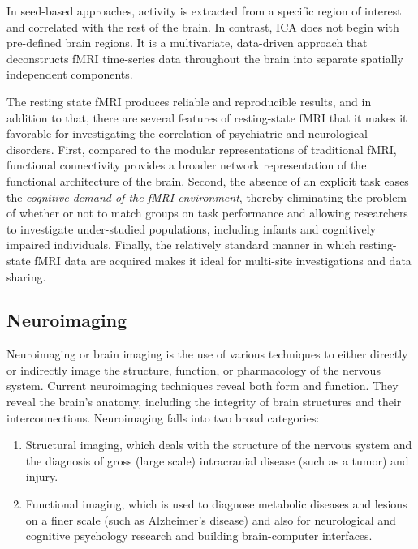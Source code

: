 \documentclass{article}
\begin{document}
In seed-based approaches, activity is extracted from a specific region
of interest and correlated with the rest of the brain. In contrast,
ICA does not begin with pre-defined brain regions. It is a
multivariate, data-driven approach that deconstructs fMRI time-series
data throughout the brain into separate spatially independent
components.

The resting state fMRI produces reliable and reproducible results, and
in addition to that, there are several features of resting-state fMRI
that it makes it favorable for investigating the correlation of
psychiatric and neurological disorders.  First, compared to the
modular representations of traditional fMRI, functional connectivity
provides a broader network representation of the functional
architecture of the brain. Second, the absence of an explicit task
eases the \textit{cognitive demand of the fMRI environment}, thereby
eliminating the problem of whether or not to match groups on task
performance and allowing researchers to investigate under-studied
populations, including infants and cognitively impaired individuals.
Finally, the relatively standard manner in which resting-state fMRI
data are acquired makes it ideal for multi-site investigations and
data sharing.

\subsection{Neuroimaging}

Neuroimaging or brain imaging is the use of various techniques to
either directly or indirectly image the structure, function, or
pharmacology of the nervous system. Current neuroimaging techniques
reveal both form and function. They reveal the brain's anatomy,
including the integrity of brain structures and their
interconnections. Neuroimaging falls into two broad categories:

\begin{enumerate}

  \item Structural imaging, which deals with the structure of the
    nervous system and the diagnosis of gross (large scale)
    intracranial disease (such as a tumor) and injury.

  \item Functional imaging, which is used to diagnose metabolic
    diseases and lesions on a finer scale (such as Alzheimer's
    disease) and also for neurological and cognitive psychology
    research and building brain-computer interfaces.

\end{enumerate}
\end{document}
